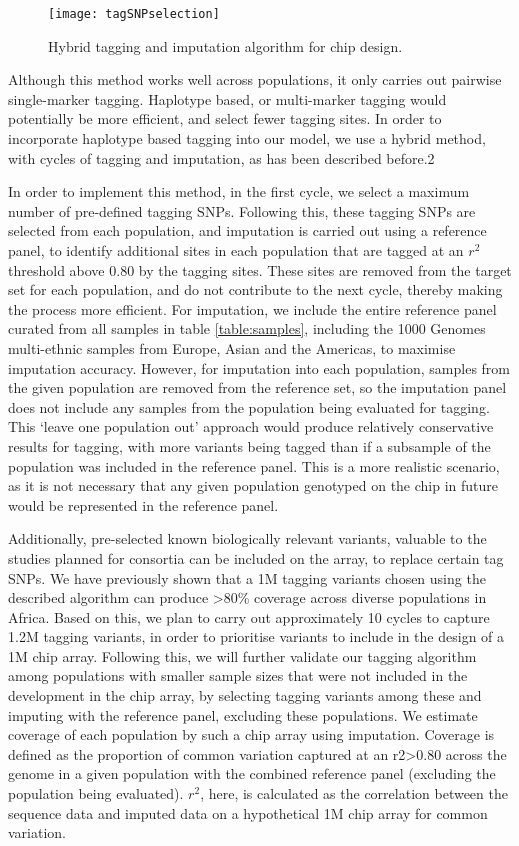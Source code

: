 \begin{figure}[h]
\caption{Hybrid tagging and imputation algorithm for chip design.}
\centering
\texttt{[image: tagSNPselection]}
\end{figure}

Although this method works well across populations, it only carries out pairwise single-marker tagging. Haplotype based, or multi-marker tagging would potentially be more efficient, and select fewer tagging sites. In order to incorporate haplotype based tagging into our model, we use a hybrid method, with cycles of tagging and imputation, as has been described before.2 

In order to implement this method, in the first cycle, we select a maximum number of pre-defined tagging SNPs. Following this, these tagging SNPs are selected from each population, and imputation is carried out using a reference panel, to identify additional sites in each population that are tagged at an $r^{2}$ threshold above 0.80 by the tagging sites. These sites are removed from the target set for each population, and do not contribute to the next cycle, thereby making the process more efficient. For imputation, we include the entire reference panel curated from all samples in table \ref{table:samples}, including the 1000 Genomes multi-ethnic samples from Europe, Asian and the Americas, to maximise imputation accuracy. However, for imputation into each population, samples from the given population are removed from the reference set, so the imputation panel does not include any samples from the population being evaluated for tagging. This ‘leave one population out’ approach would produce relatively conservative results for tagging, with more variants being tagged than if a subsample of the population was included in the reference panel. This is a more realistic scenario, as it is not necessary that any given population genotyped on the chip in future would be represented in the reference panel.

Additionally, pre-selected known biologically relevant variants, valuable to the studies planned for consortia can be included on the array, to replace certain tag SNPs. We have previously shown that a 1M tagging variants chosen using the described algorithm can produce \textgreater80\% coverage across diverse populations in Africa. Based on this, we plan to carry out approximately 10 cycles to capture 1.2M tagging variants, in order to prioritise variants to include in the design of a 1M chip array. Following this, we will further validate our tagging algorithm among populations with smaller sample sizes that were not included in the development in the chip array, by selecting tagging variants among these and imputing with the reference panel, excluding these populations. We estimate coverage of each population by such a chip array using imputation. Coverage is defined as the proportion of common variation captured at an r2>0.80 across the genome in a given population with the combined reference panel (excluding the population being evaluated). $r^{2}$, here, is calculated as the correlation between the sequence data and imputed data on a hypothetical 1M chip array for common variation. 

